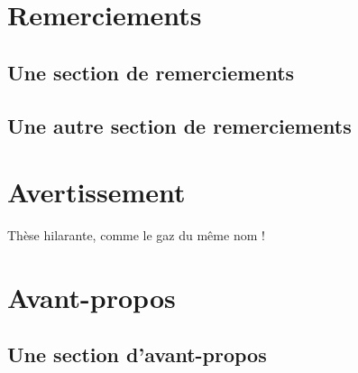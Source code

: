 \documentclass[12pt,version=final,space=onehalf,localtocs,localbibs]{yathesis}
\begin{document}
\makelaboratory
%
\dedication{À mon directeur bien-aimé !}
\dedication{À mon co-directeur bien-co-aimé aussi !}
\dedication{Je dédie également ce travail\\à tous ceux qui le méritent}
\makededications
%
\makefrontepigraphs
%
\begin{abstract}
  \lipsum[1-2]
\end{abstract}
\begin{abstract}
  \lipsum[3-4]
\end{abstract}
%
\makeabstract
%
\chapter{Remerciements}
\section{Une section de remerciements}
\lipsum[1]
\section{Une autre section de remerciements}
\lipsum[2-9]
%
\chapter{Avertissement}
Thèse hilarante, comme le gaz du même nom !
%
\printabbreviations
%
\printsymbols
%
\chapter{Avant-propos}
\section{Une section d'avant-propos}
\lipsum[30-45]
\end{document}
